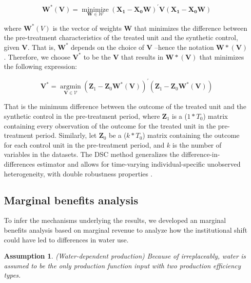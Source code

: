 \documentclass[default, sn-standardnature]{sn-jnl}
\newtheorem{ass}{Assumption}
\begin{document}
\begin{equation}
    \mathbf{W^{*}(V)}=\underset{\mathbf{W} \in \mathcal{W}}{\operatorname{minimize}}\left(\mathbf{X}_{\mathbf{1}}-\mathbf{X}_{\mathbf{0}} \mathbf{W}\right)^{\prime} \mathbf{V}\left(\mathbf{X}_{\mathbf{1}}-\mathbf{X}_{\mathbf{0}} \mathbf{W}\right)
\end{equation}

where $\mathbf{W}^{*}(V)$ is the vector of weights $\mathbf{W}$ that minimizes the difference between the pre-treatment characteristics of the treated unit and the synthetic control, given $\mathbf{V}$. That is, $\mathbf{W^{*}}$ depends on the choice of $\mathbf{V}$ –hence the notation $\mathbf{W*(V)}$. Therefore, we choose $\mathbf{V^{*}}$ to be the $\mathbf{V}$ that results in $\mathbf{W*(V)}$ that minimizes the following expression:

\begin{equation}
    \mathbf{V}^{*}=\underset{\mathbf{V} \in \mathcal{V}}{\operatorname{argmin}}\left(\mathbf{Z}_{1}-\mathbf{Z}_{0} \mathbf{W}^{*}(\mathbf{V})\right)^{\prime}\left(\mathbf{Z}_{1}-\mathbf{Z}_{0} \mathbf{W}^{*}(\mathbf{V})\right)
\end{equation}

That is the minimum difference between the outcome of the treated unit and the synthetic control in the pre-treatment period, where $\mathbf{Z}_{1}$ is a ($1*T_0$) matrix containing every observation of the outcome for the treated unit in the pre-treatment period. Similarly, let $\mathbf{Z}_{0}$ be a ($k * T_0$) matrix containing the outcome for each control unit in the pre-treatment period, and $k$ is the number of variables in the datasets.
The DSC method generalizes the difference-in-differences estimator and allows for time-varying individual-specific unobserved heterogeneity, with double robustness properties \cite{billmeier2013, smith2015}.

\subsection{Marginal benefits analysis}\label{sec:model}
To infer the mechanisms underlying the results, we developed an marginal benefits analysis based on marginal revenue to analyze how the institutional shift could have led to differences in water use.

\begin{ass}
    (Water-dependent production) Because of irreplaceably, water is assumed to be the only production function input with two production efficiency types.
\end{ass}
\end{document}
